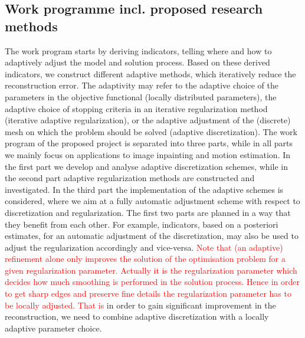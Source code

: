 \documentclass[enabledeprecatedfontcommands,cleardoublepage=empty,headsepline,twoside,11pt,DIV=15,BCOR=12mm,final]{scrartcl}
\newcommand{\nnew}[1]{{\textcolor{red}{#1}}}
\begin{document}
\subsection{Work programme incl. proposed research methods}
\label{sec:work-programme}

The work program starts by deriving indicators, telling where and how to adaptively adjust the model and solution process. Based on these derived indicators, we construct different adaptive methods, which iteratively reduce the reconstruction error. The adaptivity may refer to the adaptive choice of the parameters in the objective functional (locally distributed parameters), the adaptive choice of stopping criteria in an iterative regularization method (iterative adaptive regularization), or the adaptive adjustment of the (discrete) mesh on which the problem should be solved (adaptive discretization). The work program of the proposed project is separated into three parts, while in all parts we mainly focus on applications to image inpainting and motion estimation. In the first part we develop and analyse adaptive discretization schemes, while in the second part adaptive regularization methods are constructed and investigated. In the third part the implementation of the adaptive schemes is considered, where we aim at a fully automatic adjustment scheme with respect to discretization and regularization. The first two parts are planned in a way that they benefit from each other. %
For example, indicators, based on a posteriori estimates, for an automatic adjustment of the discretization, may also be used to adjust the regularization accordingly and vice-versa. \nnew{Note that (an adaptive) refinement alone only improves the solution of the optimisation problem for a given regularization parameter. Actually it is the regularization parameter which decides how much smoothing is performed in the solution process. Hence in order to get sharp edges and preserve fine details the regularization parameter has to be locally adjusted.} %
\nnew{That is} in order to gain significant improvement in the reconstruction, we need to combine adaptive discretization with a locally adaptive parameter choice. %
\end{document}
